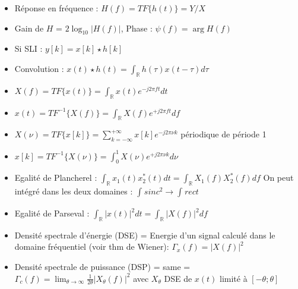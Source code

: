 \documentclass{article}
\theoremstyle{plain}%
\theoremstyle{definition}
\theoremstyle{remark}
\begin{document}
\begin{itemize}
    \item Réponse en fréquence : $ H(f) = TF\{h(t)\} = Y / X $ 
    \item Gain de $ H $ = $ 2 \log_{10} \left| H(f) \right|  $, Phase : $ \psi(f) = \arg H(f) $ 
    \item Si SLI : $ y[k] = x[k] \star h[k] $ 
    \item Convolution : $ x(t) \star h(t) = \int_{\mathbb{R}}^{}h(\tau )x(t - \tau )d\tau $ 
    \item $ X(f) = TF\{x(t)\} = \int_{\mathbb{R}}^{} x(t) e^{-j 2 \pi ft}dt $ 
    \item $ x(t) = TF^{-1}\{X(f)\} = \int_{\mathbb{R}}^{} X(f) e^{+j 2 \pi ft}df $ 
    \item $ X(\nu ) = TF\{x[k]\} = \sum_{k = -\infty }^{+ \infty }x[k] e^{- j 2 \pi \nu k}$ périodique de période 1
    \item $ x[k] = TF^{-1} \{X(\nu )\} = \int_{0}^{1}X(\nu ) e^{+j 2 \pi \nu k} d \nu $
    \item Egalité de Plancherel : $ \int_{\mathbb{R}}^{}x_1(t)x_2^*(t) dt = \int_{\mathbb{R}}^{}X_1(f)X_2^*(f) df $ On peut intégré dans les deux domaines : $ \int_{}^{}sinc^2 \to \int_{}^{}rect  $ 
    \item Egalité de Parseval : $ \int_{\mathbb{R}}^{}\left| x(t) \right| ^2 dt = \int_{\mathbb{R}}^{}\left| X(f) \right| ^2df $ 
    \item Densité spectrale d'énergie (DSE) = Energie d'un signal calculé dans le domaine fréquentiel (voir thm de Wiener): $ \Gamma _x (f) = \left| X(f) \right| ^2 $ 
    \item Densité spectrale de puissance (DSP) = same = $ \Gamma _c (f) = \lim_{\theta  \to \infty} \frac{1}{2 \theta } \left| X_\theta (f) \right| ^2 $ avec $ X_\theta  $ DSE de $ x(t) $ limité à $ [-\theta ; \theta ] $ 
\end{itemize}
\end{document}
